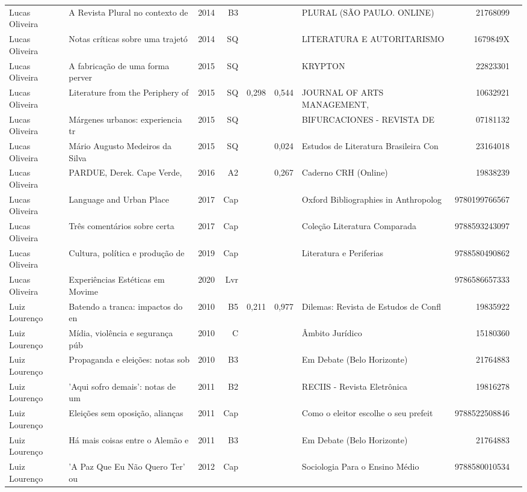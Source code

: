 \documentclass[12pt,brazil]{article}\usepackage[]{graphicx}\usepackage[]{xcolor}
\begin{document}
\begin{longtable}{lllrrllrr}
Lucas Oliveira & A Revista Plural no contexto de  & 2014 & B3 &  &  & PLURAL (SÃO PAULO. ONLINE) & 21768099 \\
Lucas Oliveira & Notas críticas sobre uma trajetó & 2014 & SQ &  &  & LITERATURA E AUTORITARISMO  & 1679849X \\
Lucas Oliveira & A fabricação de uma forma perver & 2015 & SQ &  &  & KRYPTON & 22823301 \\
Lucas Oliveira & Literature from the Periphery of & 2015 & SQ & 0,298 & 0,544 & JOURNAL OF ARTS MANAGEMENT, & 10632921 \\
Lucas Oliveira & Márgenes urbanos: experiencia tr & 2015 & SQ &  &  & BIFURCACIONES - REVISTA DE  & 07181132 \\
Lucas Oliveira & Mário Augusto Medeiros da Silva  & 2015 & SQ &  & 0,024 & Estudos de Literatura Brasileira Con & 23164018 \\
Lucas Oliveira & PARDUE, Derek. Cape Verde,  & 2016 & A2 &  & 0,267 & Caderno CRH (Online) & 19838239 \\
Lucas Oliveira & Language and Urban Place & 2017 & Cap &  &  & Oxford Bibliographies in Anthropolog & 9780199766567 \\
Lucas Oliveira & Três comentários sobre certa & 2017 & Cap &  &  & Coleção Literatura Comparada & 9788593243097 \\
Lucas Oliveira & Cultura, política e produção de  & 2019 & Cap &  &  & Literatura e Periferias & 9788580490862 \\
Lucas Oliveira & Experiências Estéticas em Movime & 2020 & Lvr &  &  &  & 9786586657333 \\
Luiz Lourenço & Batendo a tranca: impactos do en & 2010 & B5 & 0,211 & 0,977 & Dilemas: Revista de Estudos de Confl & 19835922 \\
Luiz Lourenço & Mídia, violência e segurança púb & 2010 & C &  &  & Âmbito Jurídico & 15180360 \\
Luiz Lourenço & Propaganda e eleições: notas sob & 2010 & B3 &  &  & Em Debate (Belo Horizonte) & 21764883 \\
Luiz Lourenço & ’Aqui sofro demais’: notas de um & 2011 & B2 &  &  & RECIIS - Revista Eletrônica & 19816278 \\
Luiz Lourenço & Eleições sem oposição, alianças  & 2011 & Cap &  &  & Como o eleitor escolhe o seu prefeit & 9788522508846 \\
Luiz Lourenço & Há mais coisas entre o Alemão e  & 2011 & B3 &  &  & Em Debate (Belo Horizonte) & 21764883 \\
Luiz Lourenço & ’A Paz Que Eu Não Quero Ter’ ou  & 2012 & Cap &  &  & Sociologia Para o Ensino Médio & 9788580010534 \\

\end{longtable}
\end{document}
